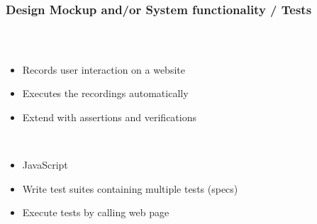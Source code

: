 \begin{frame}
  \frametitle{Design Mockup and/or System functionality / Tests}
  \begin{columns}
    \begin{column}{0.8\textwidth}
      \begin{description}[]
        \item[Frontend] \hfill \\
        \begin{itemize}
          \item Records user interaction on a website
          \item Executes the recordings automatically
          \item Extend with assertions and verifications
        \end{itemize}

        \bigskip
        \item[Backend] \hfill \\
          \begin{itemize}
            \item JavaScript
            \item Write test suites containing multiple tests (specs)
            \item Execute tests by calling web page
        \end{itemize}
      \end{description}
    \end{column}


\end{columns}
\end{frame}
